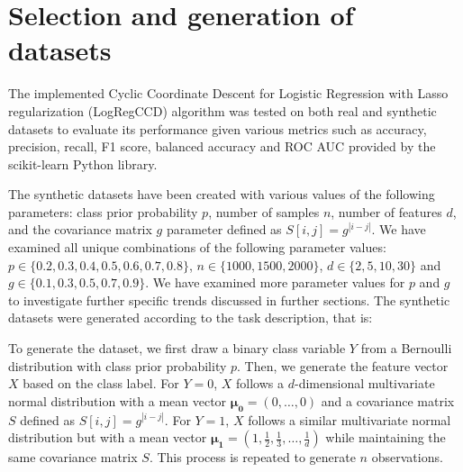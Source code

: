 \documentclass[11pt]{article}
\begin{document}
\section{Selection and generation of datasets}

The implemented Cyclic Coordinate Descent for Logistic Regression with Lasso regularization (LogRegCCD) algorithm was tested on both real and synthetic datasets to evaluate its performance given various metrics such as accuracy, precision, recall, F1 score, balanced accuracy and ROC AUC \cite{powers2011evaluation, brodersen2010balanced, fawcett2006introduction} provided by the scikit-learn \cite{scikit-learn} Python \cite{python} library. \par 



The synthetic datasets have been created with various values of the following parameters: class prior probability $p$, number of samples $n$, number of features $d$, and the covariance matrix $g$ parameter defined as $S[i,j] = g^{|i-j|}$. We have examined all unique combinations of the following parameter values: $p \in \{0.2, 0.3, 0.4, 0.5, 0.6, 0.7, 0.8\}$, $n \in \{1000, 1500, 2000\}$, $d \in \{2, 5, 10, 30\}$ and $g \in \{0.1, 0.3, 0.5, 0.7, 0.9\}$. We have examined more parameter values for $p$ and $g$ to investigate further specific trends discussed in further sections. The synthetic datasets were generated according to the task description, that is:

To generate the dataset, we first draw a binary class variable $Y$ from a Bernoulli distribution with class prior probability $p$. Then, we generate the feature vector $X$ based on the class label. For $Y = 0$, $X$ follows a $d$-dimensional multivariate normal distribution with a mean vector $\boldsymbol{\mu_0} = (0, \dots, 0)$ and a covariance matrix $S$ defined as $S[i,j] = g^{|i-j|}$. For $Y = 1$, $X$ follows a similar multivariate normal distribution but with a mean vector $\boldsymbol{\mu_1} = \left(1, \frac{1}{2}, \frac{1}{3}, \dots, \frac{1}{d} \right)$ while maintaining the same covariance matrix $S$. This process is repeated to generate $n$ observations.
\end{document}

